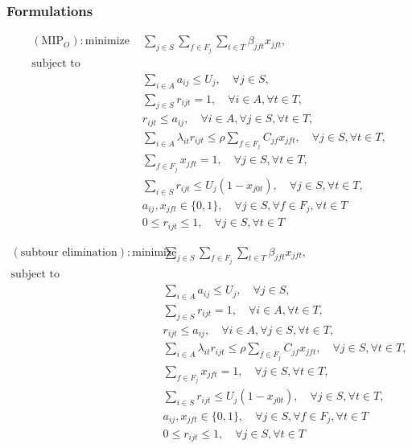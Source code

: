 \subsubsection{Formulations}
\begin{align}
(\textrm{MIP}_O): \textrm{minimize    } &\sum_{j\in S}\sum_{f\in F_j}\sum_{t\in T}\beta_{jft}x_{jft},\\
\textrm{subject to} \nonumber\\ 
&\sum_{i\in A}a_{ij} \le U_j, \quad \forall j\in S,\\
&\sum_{j\in S}r_{ijt}=1, \quad \forall i\in A, \forall t\in T,\\
&r_{ijt} \le a_{ij}, \quad \forall i\in A, \forall j\in S, \forall t\in T, \\
&\sum_{i\in A}\lambda_{it}r_{ijt} \le \rho \sum_{f\in F_j}C_{jf}x_{jft}, \quad \forall j\in S, \forall t\in T,\\
&\sum_{f\in F_j}x_{jft}=1, \quad \forall j\in S, \forall t\in T, \\
&\sum_{i\in S}r_{ijt} \le U_j(1-x_{j0t}), \quad \forall j\in S, \forall t\in T, \\
&a_{ij}, x_{jft}\in \{0,1\}, \quad \forall j\in S, \forall f\in F_j, \forall t\in T  \\
&0 \le r_{ijt} \le 1, \quad \forall j\in S, \forall t\in T
\end{align}

\begin{align}
(\textrm{subtour elimination}): \textrm{minimize    } &\sum_{j\in S}\sum_{f\in F_j}\sum_{t\in T}\beta_{jft}x_{jft},\\
\textrm{subject to} \nonumber\\ 
&\sum_{i\in A}a_{ij} \le U_j, \quad \forall j\in S,\\
&\sum_{j\in S}r_{ijt}=1, \quad \forall i\in A, \forall t\in T,\\
&r_{ijt} \le a_{ij}, \quad \forall i\in A, \forall j\in S, \forall t\in T, \\
&\sum_{i\in A}\lambda_{it}r_{ijt} \le \rho \sum_{f\in F_j}C_{jf}x_{jft}, \quad \forall j\in S, \forall t\in T,\\
&\sum_{f\in F_j}x_{jft}=1, \quad \forall j\in S, \forall t\in T, \\
&\sum_{i\in S}r_{ijt} \le U_j(1-x_{j0t}), \quad \forall j\in S, \forall t\in T, \\
&a_{ij}, x_{jft}\in \{0,1\}, \quad \forall j\in S, \forall f\in F_j, \forall t\in T  \\
&0 \le r_{ijt} \le 1, \quad \forall j\in S, \forall t\in T
\end{align}

